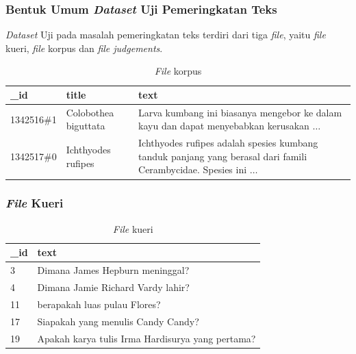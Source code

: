 \documentclass[10pt]{beamer}
\newcommand{\f}[1]{\textit{#1}}
\begin{document}
\begin{frame}
    \frametitle{Bentuk Umum \f{Dataset} Uji Pemeringkatan Teks}
    \noindent\f{Dataset} Uji pada masalah pemeringkatan teks terdiri dari tiga \f{file}, yaitu \f{file} kueri, \f{file} korpus dan \f{file judgements}.
    \begin{table}[!ht]
        \centering
        \label{tab:contoh-file-korpus}
        \caption{\f{File} korpus}
        \begin{tabular}{|l|l|p{}|}
            \hline
            \textbf{\_id}    & \textbf{title}             & \textbf{text}                                                                                                 \\ \hline
            1342516\#1  & Colobothea biguttata & Larva kumbang ini biasanya mengebor ke dalam kayu dan dapat menyebabkan kerusakan $\dots$ \\ \hline
            1342517\#0  & Ichthyodes rufipes  & Ichthyodes rufipes adalah spesies kumbang tanduk panjang yang berasal dari famili Cerambycidae. Spesies ini $\dots$ \\ \hline
        \end{tabular}
    \end{table}
\end{frame}


\begin{frame}
\frametitle{\f{File} Kueri}

    \begin{table}[!ht]
        \centering
        \caption{\f{File} kueri}
        \label{tab:query-file-example}
        \begin{tabular}{|l|p{}|}
            \hline
            \textbf{\_id} & \textbf{text}                                                                 \\ \hline
            3             & Dimana James Hepburn meninggal?                                              \\ \hline
            4             & Dimana Jamie Richard Vardy lahir?                                            \\ \hline
            11            & berapakah luas pulau Flores?                                                 \\ \hline
            17            & Siapakah yang menulis Candy Candy?                                           \\ \hline
            19            & Apakah karya tulis Irma Hardisurya yang pertama?                              \\ \hline
        \end{tabular}
    \end{table}
\end{frame}
\end{document}
